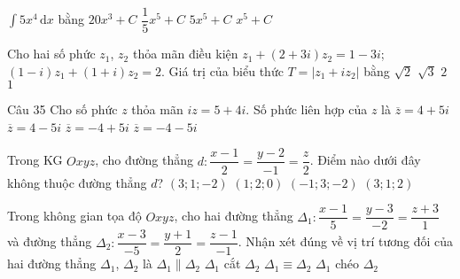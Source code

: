 \begin{ex}%
$\displaystyle\int\limits 5x^4 \mathrm{\,d}x$ bằng
\choice
{$20x^3+C$}
{$\dfrac{1}{5}x^5+C$}
{$5x^5+C$}
{\True $x^5+C$}
\end{ex}

\begin{ex}%
Cho hai số phức $z_1$, $z_2$ thỏa mãn điều kiện $z_1+(2+3i)z_2=1-3i$; $(1-i)z_1+(1+i)z_2=2$. Giá trị của biểu thức $T=\left|z_1+iz_2\right|$ bằng
\choice
{$\sqrt{2}$}
{$\sqrt{3}$}
{\True $2$}
{$1$}
\end{ex}

\begin{ex}Câu 35%
Cho số phức $z$ thỏa mãn $iz=5+4i$. Số phức liên hợp của $z$ là
\choice
{\True $\overline{z}=4+5i$}
{$\overline{z}=4-5i$}
{$\overline{z}=-4+5i$}
{$\overline{z}=-4-5i$}
\end{ex}

\begin{ex}%
Trong KG $Oxyz$, cho đường thẳng $d\colon \dfrac{x-1}{2}=\dfrac{y-2}{-1}=\dfrac{z}{2}$. Điểm nào dưới đây không thuộc đường thẳng $d$?
\choice
{\True $\left(3;1;-2\right)$}
{$\left(1;2;0\right)$}
{$\left(-1;3;-2\right)$}
{$\left(3;1;2\right)$}
\end{ex}

\begin{ex}%
Trong không gian tọa độ $Oxyz$, cho hai đường thẳng $\Delta_1\colon \dfrac{x-1}{5}=\dfrac{y-3}{-2}=\dfrac{z+3}{1}$ và đường thẳng $\Delta_2\colon \dfrac{x-3}{-5}=\dfrac{y+1}{2}=\dfrac{z-1}{-1}$. Nhận xét đúng về vị trí tương đối của hai đường thẳng $\Delta_1$, $\Delta_2$ là
\choice
{\True $\Delta_1\parallel\Delta_2$}
{$\Delta_1$ cắt $\Delta_2$}
{$\Delta_1\equiv\Delta_2$}
{$\Delta_1$ chéo $\Delta_2$}
\end{ex}

